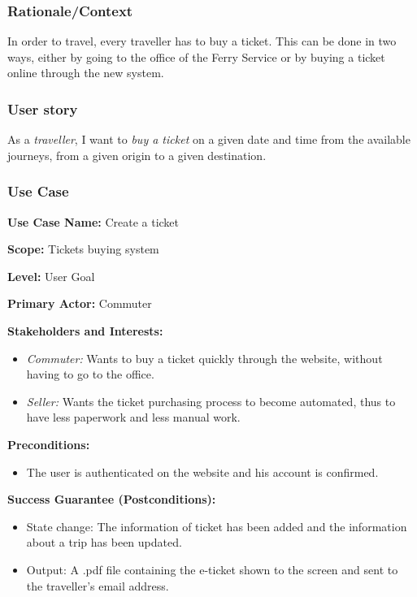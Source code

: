 \subsubsection{Rationale/Context}
In order to travel, every traveller has to buy a ticket. This can be done in two ways, either by going to the office of the Ferry Service or by buying a ticket online through the new system. 
\subsubsection{User story}
As a \textit{traveller}, I want to \textit{buy a ticket} on a given date and time from the available journeys, from a given origin to a given destination.
\subsubsection{Use Case}
\creator{\studentA}
\updater{\studentB}

\textbf{Use Case Name:} Create a ticket

\textbf{Scope:} Tickets buying system

\textbf{Level:} User Goal

\textbf{Primary Actor:} Commuter

\textbf{Stakeholders and Interests:} 
\begin{itemize}
\item \textit{Commuter:} Wants to buy a ticket quickly through the website, without having to go to the office.
\item \textit{Seller:} Wants the ticket purchasing process to become automated, thus to have less paperwork and less manual work.
\end{itemize}

\textbf{Preconditions:}
\begin{itemize}
\item The user is authenticated on the website and his account is confirmed.
\end{itemize}

\textbf{Success Guarantee (Postconditions):}
\begin{itemize}
    \item State change: The information of ticket has been added and the information about a trip has been updated.
    \item Output: A .pdf file containing the e-ticket shown to the screen and sent to the traveller's email address.
\end{itemize}

